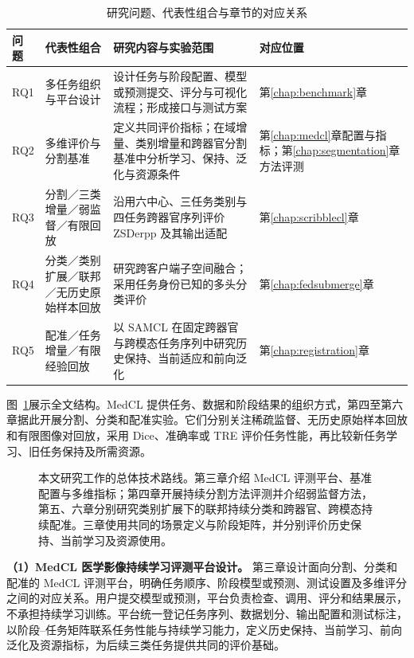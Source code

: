 \begin{table}[htbp]
\centering
\caption{研究问题、代表性组合与章节的对应关系}
\label{tab:intro-rq-mapping}
\thesistablefont
\setlength{\tabcolsep}{3pt}
\renewcommand{\arraystretch}{1.18}
\begin{tabularx}{\textwidth}{@{}p{.8cm}p{3.0cm}Xp{2.5cm}@{}}
\toprule
问题 & 代表性组合 & 研究内容与实验范围 & 对应位置 \\
\midrule
RQ1 & 多任务组织与平台设计 & 设计任务与阶段配置、模型或预测提交、评分与可视化流程；形成接口与测试方案 & 第\ref{chap:benchmark}章 \\
RQ2 & 多维评价与分割基准 & 定义共同评价指标；在域增量、类别增量和跨器官分割基准中分析学习、保持、泛化与资源条件 & 第\ref{chap:medcl}章配置与指标；第\ref{chap:segmentation}章方法评测 \\
RQ3 & 分割／三类增量／弱监督／有限回放 & 沿用六中心、三任务类别与四任务跨器官序列评价 ZSDerpp 及其输出适配 & 第\ref{chap:scribblecl}章 \\
RQ4 & 分类／类别扩展／联邦／无历史原始样本回放 & 研究跨客户端子空间融合；采用任务身份已知的多头分类评价 & 第\ref{chap:fedsubmerge}章 \\
RQ5 & 配准／任务增量／有限经验回放 & 以 SAMCL 在固定跨器官与跨模态任务序列中研究历史保持、当前适应和前向泛化 & 第\ref{chap:registration}章 \\
\bottomrule
\end{tabularx}
\end{table}

图~\ref{fig:thesis-work-logic}展示全文结构。MedCL 提供任务、数据和阶段结果的组织方式，第四至第六章据此开展分割、分类和配准实验。它们分别关注稀疏监督、无历史原始样本回放和有限图像对回放，采用 Dice、准确率或 TRE 评价任务性能，再比较新任务学习、旧任务保持及所需资源。

\begin{figure}[htbp]
\centering
\resizebox{\thesisfigurewidth}{!}{}
\caption[本文研究工作的总体技术路线]{本文研究工作的总体技术路线。第三章介绍 MedCL 评测平台、基准配置与多维指标；第四章开展持续分割方法评测并介绍弱监督方法，第五、六章分别研究类别扩展下的联邦持续分类和跨器官、跨模态持续配准。三章使用共同的场景定义与阶段矩阵，并分别评价历史保持、当前学习及资源使用。}
\label{fig:thesis-work-logic}
\end{figure}

\textbf{（1）MedCL 医学影像持续学习评测平台设计。}
第三章设计面向分割、分类和配准的 MedCL 评测平台，明确任务顺序、阶段模型或预测、测试设置及多维评分之间的对应关系。用户提交模型或预测，平台负责检查、调用、评分和结果展示，不承担持续学习训练。平台统一登记任务序列、数据划分、输出配置和测试标注，以阶段--任务矩阵联系任务性能与持续学习能力，定义历史保持、当前学习、前向泛化及资源指标，为后续三类任务提供共同的评价基础。

